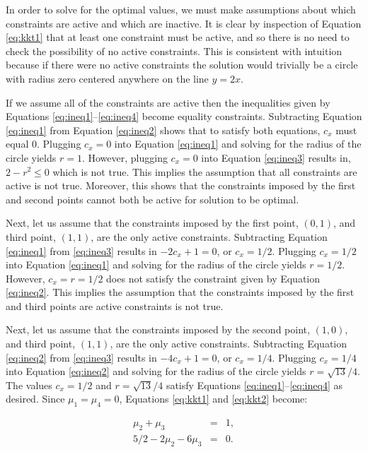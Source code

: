 \documentclass{article}
\begin{document}
\begin{enumerate}[a)]
In order to solve for the optimal values, we must make assumptions about which constraints are active and which are inactive.
It is clear by inspection of Equation \ref{eq:kkt1} that at least one constraint must be active, and so there is no need to check the possibility of no active constraints.
This is consistent with intuition because if there were no active constraints the solution would trivially be a circle with radius zero centered anywhere on the line $y=2x$.

If we assume all of the constraints are active then the inequalities given by Equations \ref{eq:ineq1}--\ref{eq:ineq4} become equality constraints.
Subtracting Equation \ref{eq:ineq1} from Equation \ref{eq:ineq2} shows that to satisfy both equations, $c_x$ must equal 0.
Plugging $c_x = 0$ into Equation \ref{eq:ineq1} and solving for the radius of the circle yields $r = 1$.
However, plugging $c_x = 0$ into Equation \ref{eq:ineq3} results in, $2 - r^2 \le 0$ which is not true.
This implies the assumption that all constraints are active is not true.
Moreover, this shows that the constraints imposed by the first and second points cannot both be active for solution to be optimal.

Next, let us assume that the constraints imposed by the first point, $(0,1)$, and third point, $(1,1)$, are the only active constraints.
Subtracting Equation \ref{eq:ineq1} from \ref{eq:ineq3} results in $-2c_x + 1 = 0$, or $c_x = 1/2$.
Plugging $c_x = 1/2$ into Equation \ref{eq:ineq1} and solving for the radius of the circle yields $r = 1/2$.
However, $c_x = r = 1/2$ does not satisfy the constraint given by Equation \ref{eq:ineq2}.
This implies the assumption that the constraints imposed by the first and third points are active constraints is not true.

Next, let us assume that the constraints imposed by the second point, $(1,0)$, and third point, $(1,1)$, are the only active constraints.
Subtracting Equation \ref{eq:ineq2} from \ref{eq:ineq3} results in $-4c_x + 1 = 0$, or $c_x = 1/4$.
Plugging $c_x = 1/4$ into Equation \ref{eq:ineq2} and solving for the radius of the circle yields $r = \sqrt{13}/4$.
The values $c_x = 1/2$ and $r = \sqrt{13}/4$ satisfy Equations \ref{eq:ineq1}--\ref{eq:ineq4} as desired.
Since $\mu_1 = \mu_4 = 0$, Equations \ref{eq:kkt1} and \ref{eq:kkt2} become: 

\begin{eqnarray*}
	\mu_2 + \mu_3 &=& 1,\\
	5/2 - 2\mu_2 - 6\mu_3 &=& 0.
\end{eqnarray*}


\end{enumerate}
\end{document}
